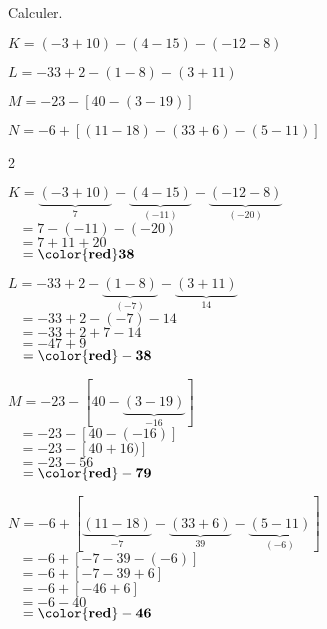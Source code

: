 \begin{exercice*}
    Calculer.
        \begin{list}{}
            \item $ K = (-3+10)-(4-15)-(-12-8)$
            \item $ L = -33+2-(1-8) -(3+11)$
            \item $ M = -23-[40-(3-19)]$
            \item $ N = -6+[(11-18)-(33+6)-(5-11)]$
        \end{list}
\end{exercice*}
\begin{corrige}
    \phantom{rrr}    
    \begin{multicols}2
        \begin{list}{}
            \item $ K=\underbrace{(-3+10)}_{7}-\underbrace{(4-15)}_{(-11)}-\underbrace{(-12-8)}_{(-20)}$\\
            $\phantom{A }=7-(-11)-(-20)$\\
            $\phantom{A }=7+11+20$\\
            $\phantom{A }=\mathbf{{\color{red}38}}$
            \item $ L=-33+2-\underbrace{(1-8)}_{(-7)} -\underbrace{(3+11)}_{14}$\\
            $\phantom{A }=-33+2-(-7)-14$\\
            $\phantom{A }=-33+2+7-14$\\
            $\phantom{A }=-47+9$\\
            $\phantom{A }=\mathbf{{\color{red}-38}}$
            \columnbreak
            \item $ M=-23-[40-\underbrace{(3-19)}_{-16}]$\\
            $\phantom{A }=-23-[40-(-16)]$\\
            $\phantom{A }=-23-[40+16)]$\\
            $\phantom{A }=-23-56$\\
            $\phantom{A }=\mathbf{{\color{red}-79}}$
            \item $ N=-6+[\underbrace{(11-18)}_{-7}-\underbrace{(33+6)}_{39}-\underbrace{(5-11)}_{(-6)}]$\\
            $\phantom{A }=-6+[-7-39-(-6)]$\\
            $\phantom{A }=-6+[-7-39+6]$\\
            $\phantom{A }=-6+[-46+6]$\\
            $\phantom{A }=-6-40$\\
            $\phantom{A }=\mathbf{{\color{red}-46}}$
        \end{list}
    \end{multicols}
\end{corrige}